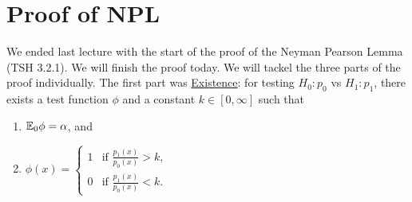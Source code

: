 \section{Proof of NPL}
We ended last lecture with the start of the proof of the Neyman Pearson Lemma (TSH 3.2.1). We will finish the proof today. We will tackel the three parts of the proof individually. The first part was \underline{Existence}: for testing $H_0 :p_0$ vs $H_1:p_1$, there exists a test function $\phi$ and a constant $k \in [0,\infty]$ such that 
\begin{enumerate}
    \item ${\mathbb{E}}_0\phi = {\alpha}$, and
    \item $\phi(x) = \begin{cases} 1 & \text{if } \frac{p_1(x)}{p_0(x)} > k,\\
     0 & \text{if } \frac{p_1(x)}{p_0(x)} < k.\end{cases}$
\end{enumerate}
